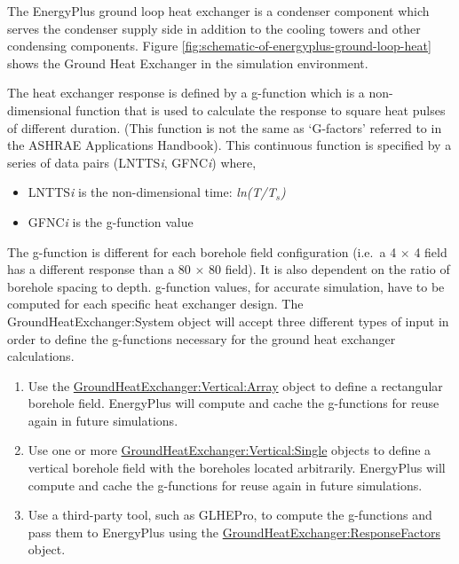The EnergyPlus ground loop heat exchanger is a condenser component which serves the condenser supply side in addition to the cooling towers and other condensing components. Figure \ref{fig:schematic-of-energyplus-ground-loop-heat} shows the Ground Heat Exchanger in the simulation environment.

The heat exchanger response is defined by a g-function which is a non-dimensional function that is used to calculate the response to square heat pulses of different duration. (This function is not the same as `G-factors' referred to in the ASHRAE Applications Handbook). This continuous function is specified by a series of data pairs (LNTTS\emph{i}, GFNC\emph{i}) where,

\begin{itemize}
\item
  LNTTS\emph{i} is the non-dimensional time: \emph{ln(T/T\(_{s}\))}
\item
  GFNC\emph{i} is the g-function value
\end{itemize}

The g-function is different for each borehole field configuration (i.e.~a 4 $\times$ 4 field has a different response than a 80 $\times$ 80 field). It is also dependent on the ratio of borehole spacing to depth. g-function values, for accurate simulation, have to be computed for each specific heat exchanger design. The GroundHeatExchanger:System object will accept three different types of input in order to define the g-functions necessary for the ground heat exchanger calculations.

\begin{enumerate}
    \item Use the \hyperref[groundheatexchangerverticalarray]{GroundHeatExchanger:Vertical:Array} object to define a rectangular borehole field. EnergyPlus will compute and cache the g-functions for reuse again in future simulations.
    \item Use one or more \hyperref[groundheatexchangerverticalsingle]{GroundHeatExchanger:Vertical:Single} objects to define a vertical borehole field with the boreholes located arbitrarily. EnergyPlus will compute and cache the g-functions for reuse again in future simulations.
    \item Use a third-party tool, such as GLHEPro, to compute the g-functions and pass them to EnergyPlus using the \hyperref[groundheatexchangerresponsefactors]{GroundHeatExchanger:ResponseFactors} object.
\end{enumerate}

